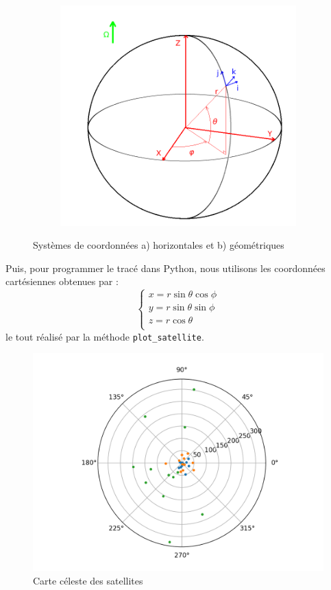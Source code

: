 \begin{figure}[h]
\begin{subfigure}[h]{.45\textwidth}
                \includegraphics[width=\textwidth]{imgs/geo}
             \end{subfigure}
             \caption{Systèmes de coordonnées a) horizontales et b) géométriques}
             \label{fig:coords-terre}
         \end{figure}

      Puis, pour programmer le tracé dans Python, nous utilisons les coordonnées cartésiennes obtenues par :
      \[\begin{cases}
           x = r\sin\theta\cos\phi \\
           y = r\sin\theta\sin\phi \\
           z = r\cos\theta \\
      \end{cases}\]
      le tout réalisé par la méthode \texttt{plot\_satellite}.

      \begin{figure}[h]
          \centering
          \includegraphics[width=.7\textwidth]{imgs/satpolar}
          \caption{Carte céleste des satellites}
          \label{fig:polarsat}
      \end{figure}

